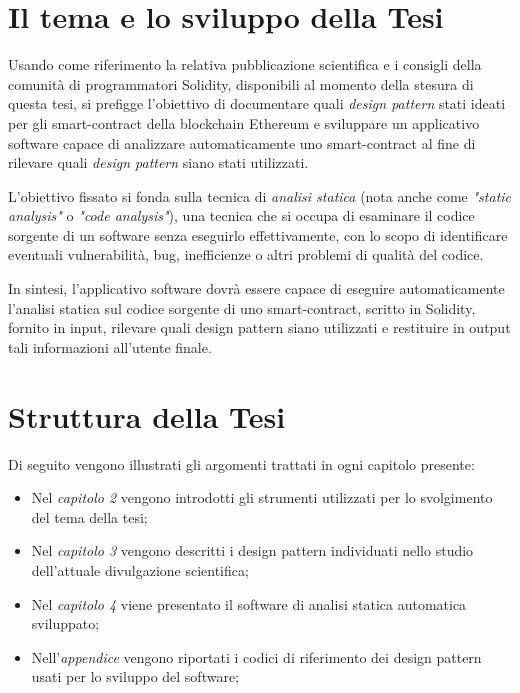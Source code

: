 \section{Il tema e lo sviluppo della Tesi}
Usando come riferimento la relativa pubblicazione scientifica e i consigli della comunità di programmatori Solidity, disponibili al momento della stesura di questa tesi, si prefigge l'obiettivo di documentare quali \textit{design pattern} stati ideati per gli smart-contract della blockchain Ethereum e sviluppare un applicativo software capace di analizzare automaticamente uno smart-contract al fine di rilevare quali \textit{design pattern} siano stati utilizzati.

L'obiettivo fissato si fonda sulla tecnica di \textit{analisi statica} (nota anche come \textit{"static analysis"} o \textit{"code analysis"}), una tecnica che si occupa di esaminare il codice sorgente di un software senza eseguirlo effettivamente, con lo scopo di identificare eventuali vulnerabilità, bug, inefficienze o altri problemi di qualità del codice. 

In sintesi, l'applicativo software dovrà essere capace di eseguire automaticamente l'analisi statica sul codice sorgente di uno smart-contract, scritto in Solidity, fornito in input, rilevare quali design pattern siano utilizzati e restituire in output tali informazioni all'utente finale. 


\section{Struttura della Tesi}
Di seguito vengono illustrati gli argomenti trattati in ogni capitolo presente:
\begin{itemize}
	\item Nel \textit{capitolo 2} vengono introdotti gli strumenti utilizzati per lo svolgimento del tema della tesi;
	\item Nel \textit{capitolo 3} vengono descritti i design pattern individuati nello studio dell'attuale divulgazione scientifica;
	\item Nel \textit{capitolo 4} viene presentato il software di analisi statica automatica sviluppato;
	\item Nell'\textit{appendice} vengono riportati i codici di riferimento dei design pattern usati per lo sviluppo del software;
\end{itemize}